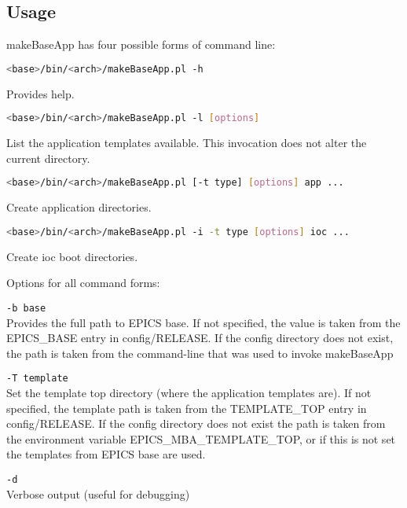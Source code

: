 \subsection{Usage}

makeBaseApp has four possible forms of command line:

\begin{lstlisting}[language=sh]
<base>/bin/<arch>/makeBaseApp.pl -h
\end{lstlisting}
Provides help.

\begin{lstlisting}[language=sh]
<base>/bin/<arch>/makeBaseApp.pl -l [options]
\end{lstlisting}
List the application templates available. This invocation does not alter the current directory.

\begin{lstlisting}[language=sh]
<base>/bin/<arch>/makeBaseApp.pl [-t type] [options] app ... 
\end{lstlisting}
Create application directories.

\begin{lstlisting}[language=sh]
<base>/bin/<arch>/makeBaseApp.pl -i -t type [options] ioc ... 
\end{lstlisting}
Create ioc boot directories.

Options for all command forms:

\begin{description}
\item \verb|-b base| \\
Provides the full path to EPICS base.
If not specified, the value is taken from the EPICS\_BASE entry in config/RELEASE.
If the config directory does not exist, the path is taken from the command-line that was used to invoke makeBaseApp

\item \verb|-T template| \\
Set the template top directory (where the application templates are).
If not specified, the template path is taken from the TEMPLATE\_TOP entry in config/RELEASE.
If the config directory does not exist the path is taken from the environment variable EPICS\_MBA\_TEMPLATE\_TOP, or if this is not set the templates from EPICS base are used.

\item \verb|-d| \\
Verbose output (useful for debugging)
\end{description}

